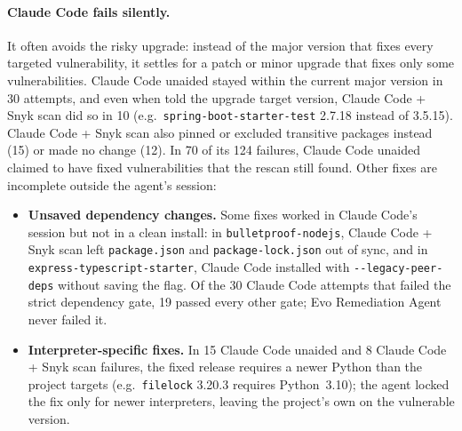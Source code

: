 \documentclass[11pt]{article}
\theoremstyle{definition}
\newcommand{\evo}{Evo Remediation Agent}
\newcommand{\aided}{Claude Code + Snyk scan}
\newcommand{\unaided}{Claude Code unaided}
\begin{document}
\paragraph{Claude Code fails silently.} It often avoids the risky upgrade: instead of the major version that fixes every targeted vulnerability, it settles for a patch or minor upgrade that fixes only some vulnerabilities. \unaided{} stayed within the current major version in 30 attempts, and even when told the upgrade target version, \aided{} did so in 10 (e.g.\ \texttt{spring-\allowbreak boot-\allowbreak starter-\allowbreak test} 2.7.18 instead of 3.5.15). \aided{} also pinned or excluded transitive packages instead (15) or made no change (12). In 70 of its 124 failures, \unaided{} claimed to have fixed vulnerabilities that the rescan still found. Other fixes are incomplete outside the agent's session:
\begin{itemize}
  \item \textbf{Unsaved dependency changes.} Some fixes worked in Claude Code's session but not in a clean install: in \texttt{bulletproof-\allowbreak nodejs}, \aided{} left \texttt{package.json} and \texttt{package-\allowbreak lock.json} out of sync, and in \texttt{express-\allowbreak typescript-\allowbreak starter}, Claude Code installed with \texttt{-{}-legacy-\allowbreak peer-\allowbreak deps} without saving the flag. Of the 30 Claude Code attempts that failed the strict dependency gate, 19 passed every other gate; \evo{} never failed it.
  \item \textbf{Interpreter-specific fixes.} In 15 \unaided{} and 8 \aided{} failures, the fixed release requires a newer Python than the project targets (e.g.\ \texttt{filelock} 3.20.3 requires Python~3.10); the agent locked the fix only for newer interpreters, leaving the project's own on the vulnerable version.
\end{itemize}
\end{document}
